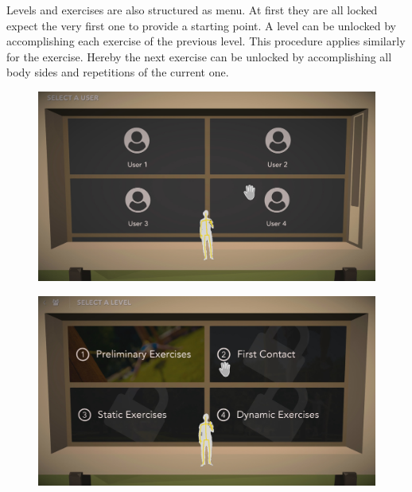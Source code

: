 Levels and exercises are also structured as menu. At first they are all locked expect the very first one to provide a starting point. A level can be unlocked by accomplishing each exercise of the previous level. This procedure applies similarly for the exercise. Hereby the next exercise can be unlocked by accomplishing all body sides and repetitions of the current one.
\begin{figure}[htb]
	\centering
	\begin{minipage}[t]{0.32\linewidth}
		\centering
		\includegraphics[width=1\linewidth]{Pictures/5_Workflow/5_UserMenu}
		\label{fig:trickline}
	\end{minipage}
	\hfill
	\begin{minipage}[t]{0.32\linewidth}
		\centering
		\includegraphics[width=1\linewidth]{Pictures/5_Workflow/6_LevelMenu}
		\label{fig:jumpline}
	\end{minipage}
	\hfill
	\begin{minipage}[t]{0.32\linewidth}

\end{minipage}
\end{figure}
